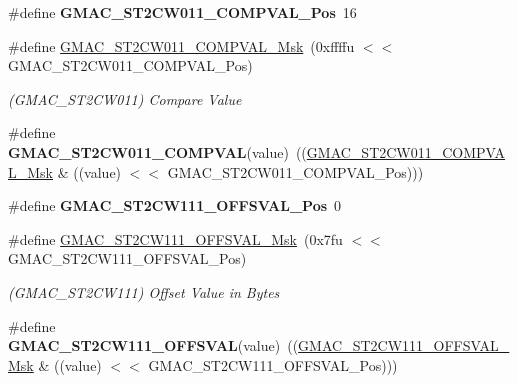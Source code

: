 \begin{DoxyCompactItemize}
\item 
\mbox{\label{group__SAMV71__GMAC_gab22c0d494eb10b752680ea9a663fae07}} 
\#define {\bfseries G\+M\+A\+C\+\_\+\+S\+T2\+C\+W011\+\_\+\+C\+O\+M\+P\+V\+A\+L\+\_\+\+Pos}~16
\item 
\mbox{\label{group__SAMV71__GMAC_ga13d2f2d282e40427344dbb5ca199f627}} 
\#define \mbox{\hyperlink{group__SAMV71__GMAC_ga13d2f2d282e40427344dbb5ca199f627}{G\+M\+A\+C\+\_\+\+S\+T2\+C\+W011\+\_\+\+C\+O\+M\+P\+V\+A\+L\+\_\+\+Msk}}~(0xffffu $<$$<$ G\+M\+A\+C\+\_\+\+S\+T2\+C\+W011\+\_\+\+C\+O\+M\+P\+V\+A\+L\+\_\+\+Pos)
\begin{DoxyCompactList}\small\item\em (G\+M\+A\+C\+\_\+\+S\+T2\+C\+W011) Compare Value \end{DoxyCompactList}\item 
\mbox{\label{group__SAMV71__GMAC_gabd8efe87650de6a9ddce2779f9b6bb8a}} 
\#define {\bfseries G\+M\+A\+C\+\_\+\+S\+T2\+C\+W011\+\_\+\+C\+O\+M\+P\+V\+AL}(value)~((\mbox{\hyperlink{group__SAMV71__GMAC_ga13d2f2d282e40427344dbb5ca199f627}{G\+M\+A\+C\+\_\+\+S\+T2\+C\+W011\+\_\+\+C\+O\+M\+P\+V\+A\+L\+\_\+\+Msk}} \& ((value) $<$$<$ G\+M\+A\+C\+\_\+\+S\+T2\+C\+W011\+\_\+\+C\+O\+M\+P\+V\+A\+L\+\_\+\+Pos)))
\item 
\mbox{\label{group__SAMV71__GMAC_gaa049f96a1bd2fa90e5c1c99a5b4ebc62}} 
\#define {\bfseries G\+M\+A\+C\+\_\+\+S\+T2\+C\+W111\+\_\+\+O\+F\+F\+S\+V\+A\+L\+\_\+\+Pos}~0
\item 
\mbox{\label{group__SAMV71__GMAC_ga04fe965ef64cc8f205fad52f8ce64827}} 
\#define \mbox{\hyperlink{group__SAMV71__GMAC_ga04fe965ef64cc8f205fad52f8ce64827}{G\+M\+A\+C\+\_\+\+S\+T2\+C\+W111\+\_\+\+O\+F\+F\+S\+V\+A\+L\+\_\+\+Msk}}~(0x7fu $<$$<$ G\+M\+A\+C\+\_\+\+S\+T2\+C\+W111\+\_\+\+O\+F\+F\+S\+V\+A\+L\+\_\+\+Pos)
\begin{DoxyCompactList}\small\item\em (G\+M\+A\+C\+\_\+\+S\+T2\+C\+W111) Offset Value in Bytes \end{DoxyCompactList}\item 
\mbox{\label{group__SAMV71__GMAC_ga8b93488277214f4c706450c0615c9cf3}} 
\#define {\bfseries G\+M\+A\+C\+\_\+\+S\+T2\+C\+W111\+\_\+\+O\+F\+F\+S\+V\+AL}(value)~((\mbox{\hyperlink{group__SAMV71__GMAC_ga04fe965ef64cc8f205fad52f8ce64827}{G\+M\+A\+C\+\_\+\+S\+T2\+C\+W111\+\_\+\+O\+F\+F\+S\+V\+A\+L\+\_\+\+Msk}} \& ((value) $<$$<$ G\+M\+A\+C\+\_\+\+S\+T2\+C\+W111\+\_\+\+O\+F\+F\+S\+V\+A\+L\+\_\+\+Pos)))

\end{DoxyCompactItemize}
